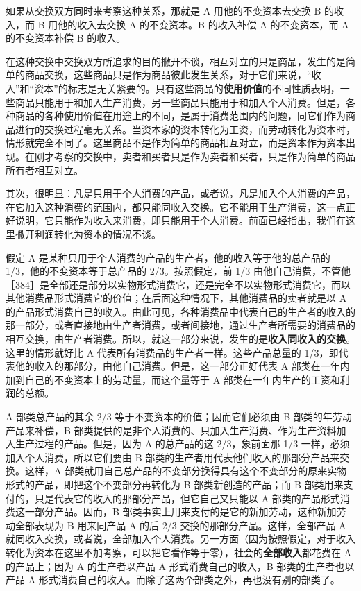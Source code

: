 如果从交换双方同时来考察这种关系，那就是 A 用他的不变资本去交换 B 的收入，而 B 用他的收入去交换 A 的不变资本。B 的收入补偿 A 的不变资本，而 A 的不变资本补偿 B 的收入。

在这种交换中\fontbox{~\{}交换双方所追求的目的撇开不谈\fontbox{\}~}，相互对立的只是商品，发生的是简单的商品交换，这些商品只是作为商品彼此发生关系，对于它们来说，“收入”和“资本”的标志是无关紧要的。只有这些商品的\textbf{使用价值}的不同性质表明，一些商品只能用于和加入生产消费，另一些商品只能用于和加入个人消费。但是，各种商品的各种使用价值在用途上的不同，是属于消费范围内的问题，同它们作为商品进行的交换过程毫无关系。当资本家的资本转化为工资，而劳动转化为资本时，情形就完全不同了。这里商品不是作为简单的商品相互对立，而是资本作为资本出现。在刚才考察的交换中，卖者和买者只是作为卖者和买者，只是作为简单的商品所有者相互对立。

其次，很明显：凡是只用于个人消费的产品，或者说，凡是加入个人消费的产品，在它加入这种消费的范围内，都只能同收入交换。它不能用于生产消费，这一点正好说明，它只能作为收入来消费，即只能用于个人消费。\fontbox{~\{}前面已经指出，我们在这里撇开利润转化为资本的情况不谈。\fontbox{\}~}

假定 A 是某种只用于个人消费的产品的生产者，他的收入等于他的总产品的 1/3，他的不变资本等于总产品的 2/3。按照假定，前 1/3 由他自己消费，不管他［384］是全部还是部分以实物形式消费它，还是完全不以实物形式消费它，而以其他消费品形式消费它的价值；在后面这种情况下，其他消费品的卖者就是以 A 的产品形式消费自己的收入。由此可见，各种消费品中代表自己的生产者的收入的那一部分，或者直接地由生产者消费，或者间接地，通过生产者所需要的消费品的相互交换，由生产者消费。所以，就这一部分来说，发生的是\textbf{收入同收入的交换}。这里的情形就好比 A 代表所有消费品的生产者一样。这些产品总量的 1/3，即代表他的收入的那部分，由他自己消费。但是，这一部分正好代表 A 部类在一年内加到自己的不变资本上的劳动量，而这个量等于 A 部类在一年内生产的工资和利润的总额。

A 部类总产品的其余 2/3 等于不变资本的价值；因而它们必须由 B 部类的年劳动产品来补偿，B 部类提供的是非个人消费的、只加入生产消费、作为生产资料加入生产过程的产品。但是，因为 A 的总产品的这 2/3，象前面那 1/3 一样，必须加入个人消费，所以它们要由 B 部类的生产者用代表他们收入的那部分产品来交换。这样，A 部类就用自己总产品的不变部分换得具有这个不变部分的原来实物形式的产品，即把这个不变部分再转化为 B 部类新创造的产品；而 B 部类用来支付的，只是代表它的收入的那部分产品，但它自己又只能以 A 部类的产品形式消费这一部分产品。因而，B 部类事实上用来支付的是它的新加劳动，这种新加劳动全部表现为 B 用来同产品 A 的后 2/3 交换的那部分产品。这样，全部产品 A 就同收入交换，或者说，全部加入个人消费。另一方面（因为按照假定，对于收入转化为资本在这里不加考察，可以把它看作等于零），社会的\textbf{全部收入}都花费在 A 的产品上；因为 A 的生产者以产品 A 形式消费自己的收入，B 部类的生产者也以产品 A 形式消费自己的收入。而除了这两个部类之外，再也没有别的部类了。

